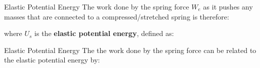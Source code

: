 \documentclass[12pt,compress,aspectratio=169]{beamer}
\begin{document}
\begin{frame}{Elastic Potential Energy}
  \vspace{-.15in}The work done by the spring force $W_e$ as it pushes any
  masses that are connected to a compressed/stretched spring is therefore:


  where $U_s$ is the  \textbf{elastic potential energy}, defined as:
  
\end{frame}



\begin{frame}{Elastic Potential Energy}
  The the work done by the spring force can be related to the elastic
  potential energy by:
  

\end{frame}
\end{document}
